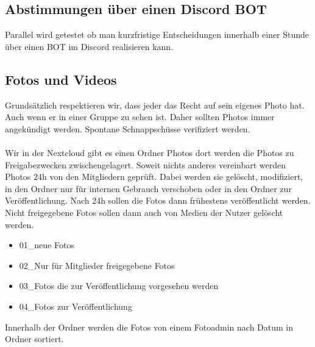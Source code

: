 \subsection{Abstimmungen über einen Discord BOT}
Parallel wird getestet ob man kurzfristige Entscheidungen innerhalb einer Stunde über einen BOT im Discord realisieren kann.

\subsection{Fotos und Videos}
Grundsätzlich respektieren wir, dass jeder das Recht auf sein eigenes Photo hat. Auch wenn er in einer Gruppe zu sehen ist. Daher sollten Photos immer angekündigt werden. Spontane Schnappschüsse verifiziert werden.\\
\ \\
Wir in der Nextcloud gibt es einen Ordner Photos dort werden die Photos zu Freigabezwecken zwischengelagert. Soweit nichts anderes vereinbart werden Photos 24h von den Mitgliedern geprüft. Dabei werden sie gelöscht, modifiziert, in den Ordner nur für internen Gebrauch verschoben oder in den Ordner zur Veröffentlichung. Nach 24h sollen die Fotos dann frühestens veröffentlicht werden. Nicht freigegebene Fotos sollen dann auch von Medien der Nutzer gelöscht werden.\ \\
\begin{itemize}
\item 01\_neue Fotos
\item 02\_Nur für Mitglieder freigegebene Fotos
\item 03\_Fotos die zur Veröffentlichung vorgesehen werden
\item 04\_Fotos zur Veröffentlichung 
\end{itemize}
Innerhalb der Ordner werden die Fotos von einem Fotoadmin nach Datum in Ordner sortiert. 
\newpage

 
